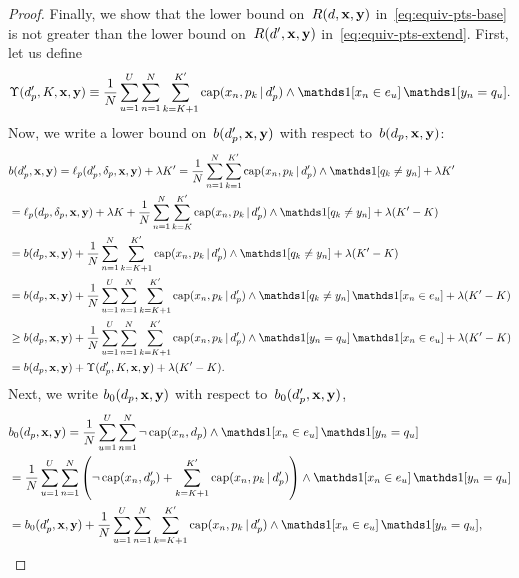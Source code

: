 \begin{arxiv}
\begin{proof}
Finally, we show that the lower bound
on~${R({d}, \mathbf{x}, \mathbf{y})}$ in~\eqref{eq:equiv-pts-base} is not greater than
the lower bound on~${R({d}', \mathbf{x}, \mathbf{y})}$ in~\eqref{eq:equiv-pts-extend}.
%
First, let us define
\begin{align}
\Upsilon(\Prefix', K, \x, \y) \equiv \frac{1}{N} \sum_{u=1}^U \sum_{n=1}^N
    \sum_{k=K+1}^{K'} \Cap(x_n, p_k \given \Prefix') \wedge \one [ x_n \in e_u ]\, \one [ y_n = q_u ].
\end{align}
Now, we write a lower bound on~${b(d_p', \mathbf{x}, \mathbf{y})}$ with respect to~${b(d_p, \mathbf{x}, \mathbf{y})}$:
\begin{align}
&b(\Prefix', \x, \y) = \Loss_p(\Prefix', \Labels, \x, \y) + \Reg K'
= \frac{1}{N} \sum_{n=1}^N \sum_{k=1}^{K'} \Cap(x_n, p_k \given \Prefix') \wedge \one [ q_k \neq y_n ] + \Reg K' \nn \\
&= \Loss_p(\Prefix, \Labels, \x, \y) + \Reg K + \frac{1}{N} \sum_{n=1}^N \sum_{k=K}^{K'} \Cap(x_n, p_k \given \Prefix') \wedge \one [ q_k \neq y_n ] + \Reg (K' - K) \nn \\
&= b(\Prefix, \x, \y) + \frac{1}{N} \sum_{n=1}^N \sum_{k=K+1}^{K'} \Cap(x_n, p_k \given \Prefix') \wedge \one [ q_k \neq y_n ] + \Reg (K' - K) \nn \\
&= b(\Prefix, \x, \y) + \frac{1}{N} \sum_{u=1}^U \sum_{n=1}^N \sum_{k=K+1}^{K'} \Cap(x_n, p_k \given \Prefix')
  \wedge \one [ q_k \neq y_n ]\, \one [ x_n \in e_u ] + \Reg (K' - K) \nn \\
&\ge b(\Prefix, \x, \y) + \frac{1}{N} \sum_{u=1}^U \sum_{n=1}^N \sum_{k=K+1}^{K'} \Cap(x_n, p_k \given \Prefix')
  \wedge \one [ y_n = q_u ]\, \one [ x_n \in e_u ] + \Reg (K' - K) \nn \\
&= b(\Prefix, \x, \y) + \Upsilon(\Prefix', K, \x, \y) + \Reg (K' - K).
\label{eq:equiv-pts-b}
\end{align}
Next, we write ${b_0(d_p, \mathbf{x}, \mathbf{y})}$ with respect to~${b_0(d_p', \mathbf{x}, \mathbf{y})}$,
\begin{align}
&b_0(\Prefix, \x, \y) = \frac{1}{N} \sum_{u=1}^U \sum_{n=1}^N
    \neg\, \Cap(x_n, \Prefix) \wedge \one [ x_n \in e_u ]\, \one [ y_n = q_u ] \nn \\
&= \frac{1}{N} \sum_{u=1}^U \sum_{n=1}^N
    \left(\neg\, \Cap(x_n, \Prefix')+ \sum_{k=K+1}^{K'} \Cap(x_n, p_k \given \Prefix') \right)
    \wedge \one [ x_n \in e_u ]\, \one [ y_n = q_u ] \nn \\
&= b_0(\Prefix', \x, \y) + \frac{1}{N} \sum_{u=1}^U \sum_{n=1}^N
    \sum_{k=K+1}^{K'} \Cap(x_n, p_k \given \Prefix') \wedge \one [ x_n \in e_u ]\, \one [ y_n = q_u ],

\end{align}
\end{proof}
\end{arxiv}
